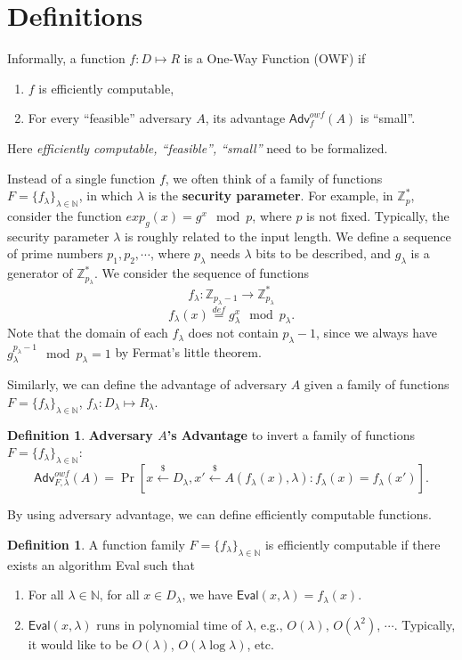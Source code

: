 \documentclass[12pt]{article}
\newcommand{\eqdef}{\stackrel{def}{=}}
\newcommand{\N}{\mathbb{N}}
\newcommand{\Z}{\mathbb{Z}}
\newcommand{\getsr}{\stackrel{\$}{\gets}}
\newcommand{\Adv}{\textsf{Adv}}
\theoremstyle{definition}
\newtheorem{definition}[theorem]{Definition}
\begin{document}
\section{Definitions}
Informally, a function $f:D\mapsto R$ is a One-Way Function (OWF) if
\begin{enumerate}
\item $f$ is efficiently computable,
\item For every ``feasible'' adversary $A$, its advantage $\Adv_f^{owf}(A)$ is ``small''.
\end{enumerate}
Here \emph{efficiently computable, ``feasible'', ``small''} need to be formalized.

Instead of a single function $f$, we often think of a family of functions $F = \{f_\lambda\}_{\lambda\in\N}$, in which $\lambda$ is the {\bf security parameter}. For example, in $\Z_p^*$, consider the function $exp_g(x) = g^x \mod p$, where $p$ is not fixed. Typically, the security parameter $\lambda$ is roughly related to the input length. We define a sequence of prime numbers $p_1, p_2, \cdots$, where $p_\lambda$ needs $\lambda$ bits to be described, and $g_\lambda$ is a generator of $\Z_{p_\lambda}^*$. We consider the sequence of functions
$$f_\lambda : \Z_{p_\lambda-1} \to \Z_{p_\lambda}^*$$
$$f_\lambda (x) \eqdef g_\lambda^x \mod p_\lambda. $$
Note that the domain of each $f_\lambda$ does not contain $p_\lambda-1$, since we always have $g_\lambda^{p_\lambda-1} \mod p_\lambda = 1$ by Fermat's little theorem.

Similarly, we can define the advantage of adversary $A$ given a family of functions $F = \{f_\lambda\}_{\lambda\in\N}$, $f_\lambda : D_\lambda \mapsto R_\lambda$.
\begin{definition}
{\bf Adversary $A$'s Advantage} to invert a family of functions $F = \{f_\lambda\}_{\lambda\in\N}$:
$$\Adv_{F,\lambda}^{owf}(A) = \Pr [x\getsr D_\lambda, x'\getsr A(f_\lambda(x), \lambda) : f_\lambda(x)=f_\lambda(x')].$$
\end{definition}

By using adversary advantage, we can define efficiently computable functions.
\begin{definition}
A function family $F = \{f_\lambda\}_{\lambda\in\N}$ is efficiently computable if there exists an algorithm \textsf{Eval} such that
\begin{enumerate}
\item For all $\lambda\in\N$, for all $x\in D_\lambda$, we have $\textsf{Eval}(x, \lambda) = f_\lambda(x)$.
\item $\textsf{Eval}(x,\lambda)$ runs in polynomial time of $\lambda$, e.g., $O(\lambda)$, $O(\lambda^2)$, $\cdots$. Typically, it would like to be $O(\lambda)$, $O(\lambda \log \lambda)$, etc.
\end{enumerate}
\end{definition}
\end{document}
